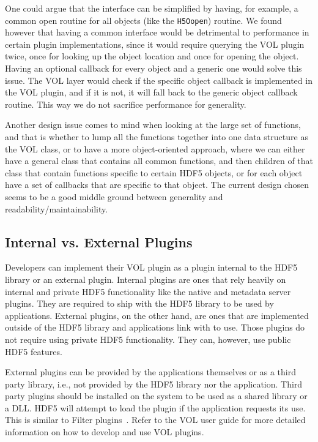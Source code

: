 \documentclass[letterpaper,hyper]{THG_RFC}
\begin{document}
One could argue that the interface can be simplified by having, for example, a common open routine for all objects (like the \texttt{H5Oopen}) routine. We found however that having  a common interface would be detrimental to performance in certain plugin implementations, since it would require querying the VOL plugin twice, once for looking up the object location and once for opening the object. Having an optional callback for every object and a generic one would solve this issue. The VOL layer would check if the specific object callback is implemented in the VOL plugin, and if it is not, it will fall back to the generic object callback routine. This way we do not sacrifice performance for generality.

Another design issue comes to mind when looking at the large set of functions, and that is whether to lump all the functions together into one data structure as the VOL class, or to have a more object-oriented approach, where we can either have a general class that contains all common functions, and then children of that class that contain functions specific to certain HDF5 objects, or for each object have a set of callbacks that are specific to that object. The current design chosen seems to be a good middle ground between generality and readability/maintainability.

\subsection{Internal vs. External Plugins}
Developers can implement their VOL plugin as a plugin internal to the HDF5 library or an external plugin. Internal plugins are ones that rely heavily on internal and private HDF5 functionality like the native and metadata server plugins. They are required to ship with the HDF5 library to be used by applications. External plugins, on the other hand, are ones that are implemented outside of the HDF5 library and applications link with to use. Those plugins do not require using private HDF5 functionality. They can, however, use public HDF5 features.

External plugins can be provided by the applications themselves or as a third party library, i.e., not provided by the HDF5 library nor the application. Third party plugins should be installed on the system to be used as a shared library or a DLL. HDF5 will attempt to load the plugin if the application requests its use. This is similar to Filter plugins~\cite{filters}. Refer to the VOL user guide for more detailed information on how to develop and use VOL plugins.
\end{document}
